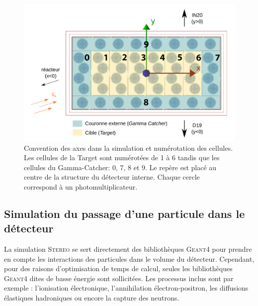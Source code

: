 {\begin{figure}[h!]
\centering
\includegraphics[width=1\linewidth]{images/convention_axe_MC.png}
\caption[Convention des axes dans la simulation et numérotation des cellules]{Convention des axes dans la simulation et numérotation des cellules. Les cellules de la Target sont numérotées de 1 à 6 tandis que les  cellules du Gamma-Catcher: 0, 7, 8 et 9. Le repère est placé au centre de la structure du détecteur interne. Chaque cercle correspond à un photomultiplicateur.}
\label{fig:convention_axe_MC.png}
\end{figure}

\clearpage

}



\bigbreak


\subsection{Simulation du passage d'une particule dans le détecteur}

\bigbreak

La simulation \textsc{Stereo} se sert directement des bibliothèques \textsc{Geant4} pour prendre en compte les interactions des particules dans le volume du détecteur. Cependant, pour des raisons d'optimisation de temps de calcul, seules les bibliothèques \textsc{Geant4} dites de basse énergie sont sollicitées. Les processus inclus sont par exemple : l'ionisation électronique, l'annihilation électron-positron, les diffusions élastiques hadroniques ou encore la capture des neutrons.\\

